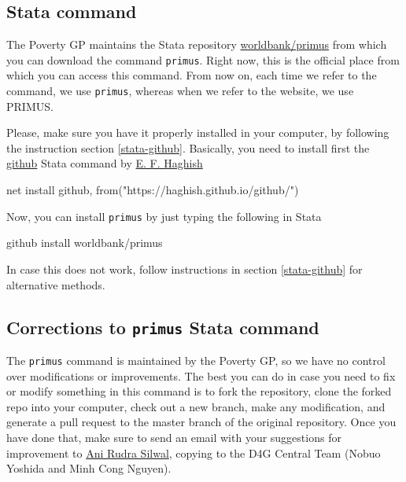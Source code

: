 \documentclass[
]{book}
\newenvironment{Shaded}{\begin{snugshade}}{\end{snugshade}}
\newcommand{\NormalTok}[1]{#1}
\newcommand{\StringTok}[1]{\textcolor[rgb]{0.31,0.60,0.02}{#1}}
\begin{document}
\hypertarget{stata-command}{%
\subsection*{Stata command}\label{stata-command}}

The Poverty GP maintains the Stata repository
\href{https://github.com/worldbank/primus}{worldbank/primus} from which you can
download the command \texttt{primus}. Right now, this is the official place from which
you can access this command. From now on, each time we refer to the command, we
use \texttt{primus}, whereas when we refer to the website, we use PRIMUS.

Please, make sure you have it properly installed in your computer, by following
the instruction section \ref{stata-github}. Basically, you need to install
first the \href{https://github.com/haghish/github}{github} Stata command by \href{https://github.com/haghish}{E. F.
Haghish}

\begin{Shaded}
\begin{Highlighting}[]
\NormalTok{net install github, from(}\StringTok{"https://haghish.github.io/github/"}\NormalTok{)}
\end{Highlighting}
\end{Shaded}

Now, you can install \texttt{primus} by just typing the following in Stata

\begin{Shaded}
\begin{Highlighting}[]
\NormalTok{github install worldbank/primus}
\end{Highlighting}
\end{Shaded}

In case this does not work, follow instructions in section \ref{stata-github}
for alternative methods.

\hypertarget{corrections-to-primus-stata-command}{%
\subsection*{\texorpdfstring{Corrections to \texttt{primus} Stata command}{Corrections to primus Stata command}}\label{corrections-to-primus-stata-command}}

The \texttt{primus} command is maintained by the Poverty GP, so we have no control over
modifications or improvements. The best you can do in case you need to fix or
modify something in this command is to fork the repository, clone the forked
repo into your computer, check out a new branch, make any modification, and
generate a pull request to the master branch of the original repository. Once
you have done that, make sure to send an email with your suggestions for
improvement to \href{mailto:asilwal@worldbank.org}{Ani Rudra Silwal}, copying to the
D4G Central Team (Nobuo Yoshida and Minh Cong Nguyen).
\end{document}
